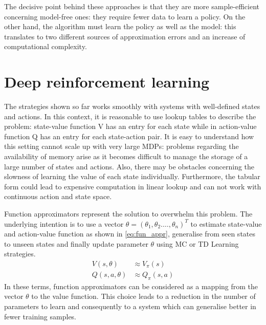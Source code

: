 The decisive point behind these approaches is that they are more sample-efficient concerning model-free ones: they require fewer data to learn a policy. On the other hand, the algorithm must learn the policy as well as the model: this translates to two different sources of approximation errors and an increase of computational complexity.

\section{Deep reinforcement learning} \label{deepreinflearn}



The strategies shown so far works smoothly with systems with well-defined states and actions. In this context, it is reasonable to use lookup tables to describe the problem: state-value function V has an entry for each state while in action-value function Q has an entry for each state-action pair.
It is easy to understand how this setting cannot scale up with very large MDPs: problems regarding the availability of memory arise as it becomes difficult to manage the storage of a large number of states and actions. Also, there may be obstacles concerning the slowness of learning the value of each state individually. Furthermore, the tabular form could lead to expensive computation in linear lookup and can not work with continuous action and state space.

Function approximators represent the solution to overwhelm this problem. The underlying intention is to use a vector $\theta = (\theta_1, \theta_2. \dots, \theta_n)^T$ to estimate state-value and action-value function as shown in \vref{eq:fun_appr}, generalise from seen states to unseen states and finally update parameter $\theta$ using MC or TD Learning strategies.
\begin{equation}\label{eq:fun_appr}
	\begin{aligned}
		V(s, \theta)    & \approx V_\pi(s)   \\
		Q(s, a, \theta) & \approx Q_\pi(s,a)
	\end{aligned}
\end{equation}
In these terms, function approximators can be considered as a mapping from the vector $\theta$ to the value function.
This choice leads to a reduction in the number of parameters to learn and consequently to a system which can generalise better in fewer training samples.

